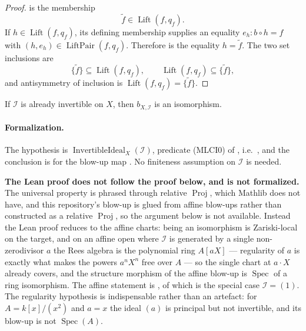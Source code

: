 \begin{proof}
   is the membership
  \[
    \widetilde f\in\operatorname{Lift}(f,q_f).
  \]
  If $h\in\operatorname{Lift}(f,q_f)$, its defining membership supplies an
  equality $e_h\colon b\circ h=f$ with
  $(h,e_h)\in\operatorname{LiftPair}(f,q_f)$.  Therefore
   is the equality
  $h=\widetilde f$.  The two set inclusions are
  \[
    \{\widetilde f\}\subseteq\operatorname{Lift}(f,q_f),
    \qquad
    \operatorname{Lift}(f,q_f)\subseteq\{\widetilde f\},
  \]
  and antisymmetry of inclusion is
  $\operatorname{Lift}(f,q_f)=\{\widetilde f\}$.
\end{proof}

\begin{corollary}
  \label{cor:nagata-blowup-cartier-iso}
  \leanok

  If $\mathcal I$ is already invertible on $X$, then
  $b_{X,\mathcal I}$ is an isomorphism.

  \paragraph{Formalization.}
  The hypothesis is $\operatorname{InvertibleIdeal}_X(\mathcal I)$, predicate (MLCI0) of
  , i.e.\
  \texttt{}, and the
  conclusion is \texttt{\detokenize{IsIso}} for the blow-up map
  \texttt{}.  No finiteness assumption on
  $\mathcal I$ is needed.

  \textbf{The Lean proof does not follow the proof below, and
   is not formalized.}  The universal property is
  phrased through relative $\operatorname{Proj}$, which Mathlib does not have, and this
  repository's blow-up is glued from affine blow-ups rather than constructed as a relative
  $\operatorname{Proj}$, so the argument below is not available.  Instead the Lean proof
  reduces to the affine charts: being an isomorphism is Zariski-local on the target, and on
  an affine open where $\mathcal I$ is generated by a single non-zerodivisor $a$ the Rees
  algebra is the polynomial ring $A[aX]$ --- regularity of $a$ is exactly what makes the
  powers $a^nX^n$ free over $A$ --- so the single chart at $a\cdot X$ already covers, and the
  structure morphism of the affine blow-up is $\operatorname{Spec}$ of a ring isomorphism.
  The affine statement is
  \texttt{}, of
  which \Cref{lemma:nagata-affine-blowup-top} is the special case $\mathcal I=(1)$.  The
  regularity hypothesis is indispensable rather than an artefact: for $A=k[x]/(x^2)$ and
  $a=x$ the ideal $(a)$ is principal but not invertible, and its blow-up is not
  $\operatorname{Spec}(A)$.
\end{corollary}

